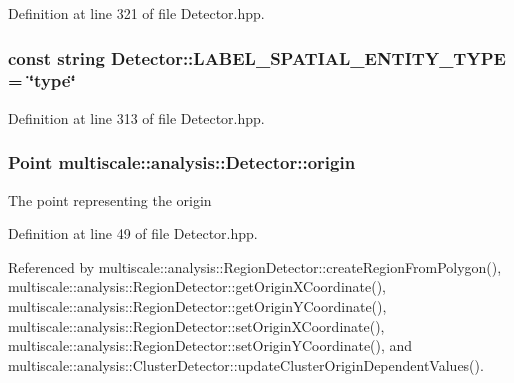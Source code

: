\-Definition at line 321 of file \-Detector.\-hpp.

\hypertarget{classmultiscale_1_1analysis_1_1Detector_ac93f1fd6bdc7250b890480c7d5acf5b0}{
\subsubsection[{\-L\-A\-B\-E\-L\-\_\-\-S\-P\-A\-T\-I\-A\-L\-\_\-\-E\-N\-T\-I\-T\-Y\-\_\-\-T\-Y\-P\-E}]{\setlength{\rightskip}{0pt plus 5cm}const string {\bf \-Detector\-::\-L\-A\-B\-E\-L\-\_\-\-S\-P\-A\-T\-I\-A\-L\-\_\-\-E\-N\-T\-I\-T\-Y\-\_\-\-T\-Y\-P\-E} = \char`\"{}type\char`\"{}}}\label{classmultiscale_1_1analysis_1_1Detector_ac93f1fd6bdc7250b890480c7d5acf5b0}


\-Definition at line 313 of file \-Detector.\-hpp.

\hypertarget{classmultiscale_1_1analysis_1_1Detector_a002237e2ad684975a7c8b1e12dd7d780}{
\subsubsection[{origin}]{\setlength{\rightskip}{0pt plus 5cm}\-Point {\bf multiscale\-::analysis\-::\-Detector\-::origin}}}\label{classmultiscale_1_1analysis_1_1Detector_a002237e2ad684975a7c8b1e12dd7d780}
\-The point representing the origin 

\-Definition at line 49 of file \-Detector.\-hpp.



\-Referenced by multiscale\-::analysis\-::\-Region\-Detector\-::create\-Region\-From\-Polygon(), multiscale\-::analysis\-::\-Region\-Detector\-::get\-Origin\-X\-Coordinate(), multiscale\-::analysis\-::\-Region\-Detector\-::get\-Origin\-Y\-Coordinate(), multiscale\-::analysis\-::\-Region\-Detector\-::set\-Origin\-X\-Coordinate(), multiscale\-::analysis\-::\-Region\-Detector\-::set\-Origin\-Y\-Coordinate(), and multiscale\-::analysis\-::\-Cluster\-Detector\-::update\-Cluster\-Origin\-Dependent\-Values().

